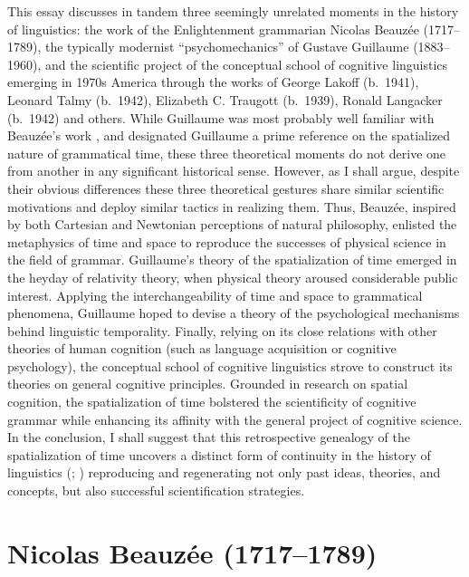 \documentclass[output=paper]{langsci/langscibook}
\begin{document}
 This essay discusses in tandem three seemingly unrelated moments in the history of linguistics: the work of the Enlightenment grammarian Nicolas Beauzée (1717–1789), the typically modernist “psychomechanics” of Gustave Guillaume (1883–1960), and the scientific project of the conceptual school of cognitive linguistics emerging in 1970s America through the works of George Lakoff (b.~1941), Leonard Talmy (b.~1942), Elizabeth C. Traugott (b.~1939), Ronald Langacker (b.~1942) and others. While Guillaume was most probably well familiar with Beau\-zée’s work \citep{fournier_histoire_2013}, and \citet{traugott_spatial_1975} designated Guillaume a prime reference on the spatialized nature of grammatical time, these three theoretical moments do not derive one from another in any significant historical sense. However, as I shall argue, despite their obvious differences these three theoretical gestures share similar scientific motivations and deploy similar tactics in realizing them. Thus, Beauzée, inspired by both Cartesian and Newtonian perceptions of natural philosophy, enlisted the metaphysics of time and space to reproduce the successes of physical science in the field of grammar. Guillaume’s theory of the spatialization of time emerged in the heyday of relativity theory, when physical theory aroused considerable public interest. Applying the interchangeability of time and space to grammatical phenomena, Guillaume hoped to devise a theory of the psychological mechanisms behind linguistic temporality. Finally, relying on its close relations with other theories of human cognition (such as language acquisition or cognitive psychology), the conceptual school of cognitive linguistics strove to construct its theories on general cognitive principles. Grounded in research on spatial cognition, the spatialization of time bolstered the scientificity of cognitive grammar while enhancing its affinity with the general project of cognitive science. In the conclusion, I shall suggest that this retrospective genealogy of the spatialization of time uncovers a distinct form of continuity in the history of linguistics (\citealt{auroux_histoire_1980}; \citealt{colombat_histoire_2010}) reproducing and regenerating not only past ideas, theories, and concepts, but also successful scientification strategies.
 
 \section{Nicolas Beauzée (1717–1789)}
 
\end{document}
